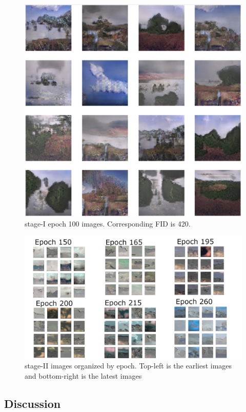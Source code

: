 \documentclass{article}
\begin{document}
	\begin{figure}[h]
	\centering
	\includegraphics[scale=0.4]{images/StageI_epoch100_FID420.png}
	\caption{stage-I epoch 100 images. Corresponding FID is 420.}
	\label{fig:stage1Images}
	\end{figure}


	\begin{figure}[h]
	\centering
	\includegraphics[scale=1]{images/Stage2Images.png}
	\caption{stage-II images organized by epoch. Top-left is the earliest images and bottom-right is the latest images}
	\label{fig:stage2Images}
	\end{figure}

	\subsection{Discussion}	
\end{document}
